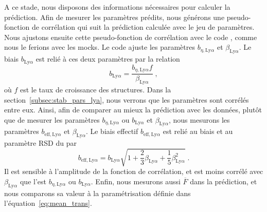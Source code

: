 A ce stade, nous disposons des informations nécessaires pour calculer la prédiction. Afin de mesurer les paramètres \lya{} prédits, nous générons une pseudo-fonction de corrélation qui suit la prédiction calculée avec le jeu de paramètres. Nous ajustons ensuite cette pseudo-fonction de corrélation avec le code \picca{}, comme nous le ferions avec les mocks.
  Le code \picca{} ajuste les paramètres $b_{\eta, \mathrm{Ly}\alpha}$ et $\beta_{\mathrm{Ly}\alpha}$. Le biais $b_{\mathrm{Ly}\alpha}$ est relié à ces deux paramètres par la relation
  \begin{equation}
    \label{eq:def_bias}
    b_{\mathrm{Ly}\alpha}  = \frac{b_{\eta, \mathrm{Ly}\alpha} f}{\beta_{\mathrm{Ly}\alpha}} \; ,
  \end{equation}
  où $f$ est le taux de croissance des structures.
  Dans la section~\ref{subsec:stab_pars_lya}, nous verrons que les paramètres \lya{} sont corrélés entre eux.
  Ainsi, afin de comparer au mieux la prédiction avec les données, plutôt que de mesurer les paramètres $b_{\eta, \mathrm{Ly}\alpha}$ ou $b_{\mathrm{Ly}\alpha}$ et $\beta_{\mathrm{Ly}\alpha}$, nous mesurons les paramètres $b_{\mathrm{eff},\mathrm{Ly}\alpha}$ et $\beta_{\mathrm{Ly}\alpha}$.
  Le biais effectif $b_{\mathrm{eff},\mathrm{Ly}\alpha}$ est relié au biais et au paramètre RSD du \lya{} par
  \begin{equation}
    \label{eq:def_bias_eff}
    b_{\mathrm{eff},\mathrm{Ly}\alpha} = b_{\mathrm{Ly}\alpha} \sqrt{1 + \frac{2}{3} \beta_{\mathrm{Ly}\alpha} + \frac{1}{5} \beta_{\mathrm{Ly}\alpha}^2} \; .
  \end{equation}
  Il est sensible à l'amplitude de la fonction de corrélation, et est moins corrélé avec $\beta_{\mathrm{Ly}\alpha}$ que l'est $b_{\eta, \mathrm{Ly}\alpha}$ ou $b_{\mathrm{Ly}\alpha}$.
  Enfin, nous mesurons aussi $\overline F$ dans la prédiction, et nous comparons sa valeur à la paramétrisation définie dans l'équation~\ref{eq:mean_trans}.
